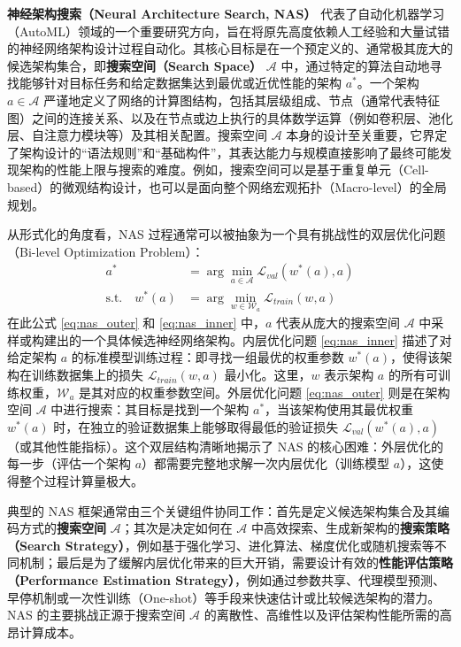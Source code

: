 \documentclass[../main.tex]{subfiles}
\begin{document}

\textbf{神经架构搜索（Neural Architecture Search, NAS）} 代表了自动化机器学习（AutoML）领域的一个重要研究方向，旨在将原先高度依赖人工经验和大量试错的神经网络架构设计过程自动化。其核心目标是在一个预定义的、通常极其庞大的候选架构集合，即\textbf{搜索空间（Search Space）} $\mathcal{A}$ 中，通过特定的算法自动地寻找能够针对目标任务和给定数据集达到最优或近优性能的架构 $a^*$。一个架构 $a \in \mathcal{A}$ 严谨地定义了网络的计算图结构，包括其层级组成、节点（通常代表特征图）之间的连接关系、以及在节点或边上执行的具体数学运算（例如卷积层、池化层、自注意力模块等）及其相关配置。搜索空间 $\mathcal{A}$ 本身的设计至关重要，它界定了架构设计的“语法规则”和“基础构件”，其表达能力与规模直接影响了最终可能发现架构的性能上限与搜索的难度。例如，搜索空间可以是基于重复单元（Cell-based）的微观结构设计，也可以是面向整个网络宏观拓扑（Macro-level）的全局规划。

从形式化的角度看，NAS 过程通常可以被抽象为一个具有挑战性的双层优化问题（Bi-level Optimization Problem）：
\begin{align}
	a^{*}                      & = \arg\min_{a \in \mathcal{A}} \mathcal{L}_{val}(w^{*}(a), a) \label{eq:nas_outer} \\
	\text{s.t.} \quad w^{*}(a) & = \arg\min_{w \in \mathcal{W}_a} \mathcal{L}_{train}(w, a) \label{eq:nas_inner}
\end{align}
在此公式 \eqref{eq:nas_outer} 和 \eqref{eq:nas_inner} 中，$a$ 代表从庞大的搜索空间 $\mathcal{A}$ 中采样或构建出的一个具体候选神经网络架构。内层优化问题 \eqref{eq:nas_inner} 描述了对给定架构 $a$ 的标准模型训练过程：即寻找一组最优的权重参数 $w^{*}(a)$，使得该架构在训练数据集上的损失 $\mathcal{L}_{train}(w, a)$ 最小化。这里，$w$ 表示架构 $a$ 的所有可训练权重，$\mathcal{W}_a$ 是其对应的权重参数空间。外层优化问题 \eqref{eq:nas_outer} 则是在架构空间 $\mathcal{A}$ 中进行搜索：其目标是找到一个架构 $a^*$，当该架构使用其最优权重 $w^*(a)$ 时，在独立的验证数据集上能够取得最低的验证损失 $\mathcal{L}_{val}(w^{*}(a), a)$（或其他性能指标）。这个双层结构清晰地揭示了 NAS 的核心困难：外层优化的每一步（评估一个架构 $a$）都需要完整地求解一次内层优化（训练模型 $a$），这使得整个过程计算量极大。

典型的 NAS 框架通常由三个关键组件协同工作：首先是定义候选架构集合及其编码方式的\textbf{搜索空间} $\mathcal{A}$；其次是决定如何在 $\mathcal{A}$ 中高效探索、生成新架构的\textbf{搜索策略（Search Strategy）}，例如基于强化学习、进化算法、梯度优化或随机搜索等不同机制；最后是为了缓解内层优化带来的巨大开销，需要设计有效的\textbf{性能评估策略（Performance Estimation Strategy）}，例如通过参数共享、代理模型预测、早停机制或一次性训练（One-shot）等手段来快速估计或比较候选架构的潜力。NAS 的主要挑战正源于搜索空间 $\mathcal{A}$ 的离散性、高维性以及评估架构性能所需的高昂计算成本。
\end{document}
